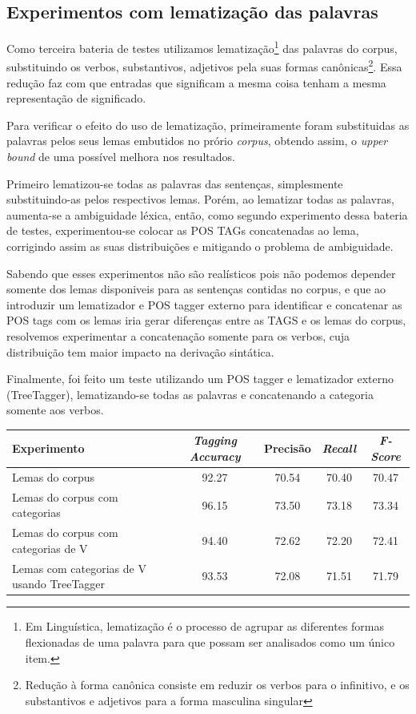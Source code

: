 \subsection{Experimentos com lematização das palavras}
\label{sec:lematizacao}

Como terceira bateria de testes utilizamos lematização\footnote{Em Linguística, lematização é o processo de agrupar as diferentes formas flexionadas de uma palavra para que possam ser analisados como um único item.} das palavras do corpus, substituindo os verbos,
substantivos, adjetivos pela suas formas canônicas\footnote{Redução à forma canônica consiste em reduzir os verbos para o infinitivo, e os substantivos e adjetivos para a forma masculina singular}. Essa redução faz com que entradas que significam a mesma coisa tenham a mesma representação de significado.

Para verificar o efeito do uso de lematização, primeiramente foram substituidas as palavras pelos seus lemas embutidos no prório \emph{corpus}, obtendo assim, o \emph{upper bound} de uma possível melhora nos resultados.

Primeiro lematizou-se todas as palavras das sentenças, simplesmente substituindo-as pelos respectivos lemas. Porém, ao lematizar todas as palavras, aumenta-se a ambiguidade léxica, então, como segundo experimento dessa bateria de testes, experimentou-se colocar as POS TAGs concatenadas ao lema, corrigindo assim as suas distribuições e mitigando o problema de ambiguidade. 

Sabendo que esses experimentos não são realísticos pois não podemos depender somente dos lemas disponiveis para as sentenças contidas no corpus, e que ao introduzir um lematizador e POS tagger externo para identificar e concatenar as POS tags com os lemas iria gerar diferenças entre as TAGS e os lemas do corpus, resolvemos experimentar a concatenação somente para os verbos, cuja distribuição tem maior impacto na derivação sintática.

Finalmente, foi feito um teste utilizando um POS tagger e lematizador externo (TreeTagger), lematizando-se todas as palavras e concatenando a categoria somente aos verbos.


\begin{center}
   \footnotesize
	\begin{tabular}{|l|c|c|c|c|}
		\hline
		\textbf{Experimento} &  \textbf{\emph{Tagging Accuracy}} & \textbf{Precisão} & \textbf{\emph{Recall}} & \textbf{\emph{F-Score}} \\
		\hline
		Lemas do corpus & 92.27 & 70.54 & 70.40 & 70.47\\
		\hline		
		Lemas do corpus com categorias & 96.15 & 73.50 & 73.18 & 73.34\\
		\hline		
		Lemas do corpus com categorias de V & 94.40 & 72.62 & 72.20 & 72.41\\
		\hline		
		Lemas com categorias de V usando TreeTagger & 93.53 & 72.08 & 71.51 & 71.79\\
		\hline
	\end{tabular}
	\label{tab:terceiro_experimento}
\end{center}



